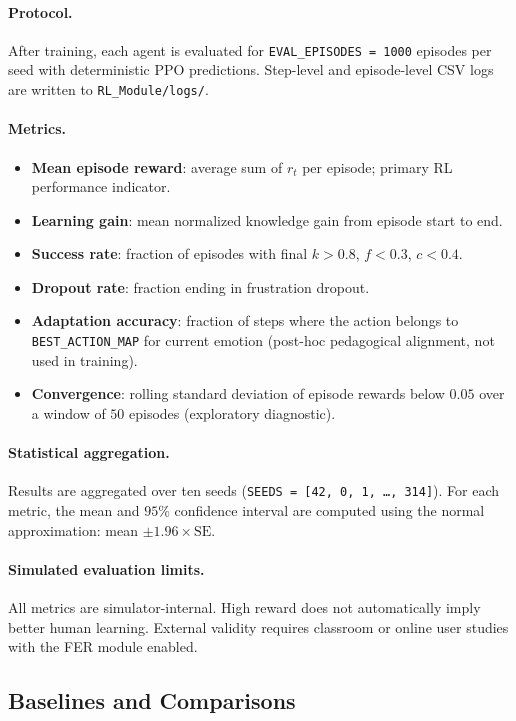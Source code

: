 \paragraph{Protocol.}
After training, each agent is evaluated for \texttt{EVAL\_EPISODES = 1000} episodes per seed with deterministic PPO predictions. Step-level and episode-level CSV logs are written to \texttt{RL\_Module/logs/}.

\paragraph{Metrics.}
\begin{itemize}
    \item \textbf{Mean episode reward}: average sum of $r_t$ per episode; primary RL performance indicator.
    \item \textbf{Learning gain}: mean normalized knowledge gain from episode start to end.
    \item \textbf{Success rate}: fraction of episodes with final $k>0.8$, $f<0.3$, $c<0.4$.
    \item \textbf{Dropout rate}: fraction ending in frustration dropout.
    \item \textbf{Adaptation accuracy}: fraction of steps where the action belongs to \texttt{BEST\_ACTION\_MAP} for current emotion (post-hoc pedagogical alignment, not used in training).
    \item \textbf{Convergence}: rolling standard deviation of episode rewards below $0.05$ over a window of $50$ episodes (exploratory diagnostic).
\end{itemize}

\paragraph{Statistical aggregation.}
Results are aggregated over ten seeds (\texttt{SEEDS = [42, 0, 1, \ldots, 314]}). For each metric, the mean and $95\%$ confidence interval are computed using the normal approximation: mean $\pm 1.96 \times \mathrm{SE}$.

\paragraph{Simulated evaluation limits.}
All metrics are simulator-internal. High reward does not automatically imply better human learning. External validity requires classroom or online user studies with the FER module enabled.

\subsection{Baselines and Comparisons}\label{sec:method_baselines}

